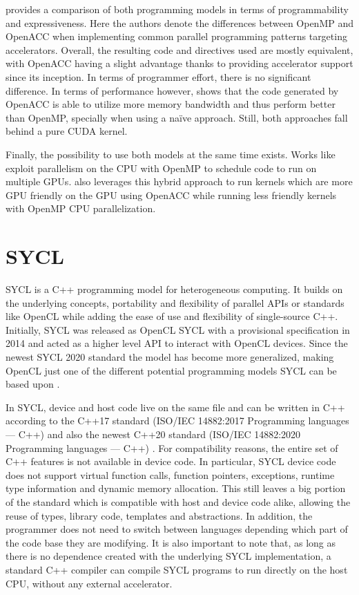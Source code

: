 \cite{openmp_vs_openacc} provides a comparison of both programming models in terms of programmability and expressiveness. Here the authors denote the differences between OpenMP and OpenACC when implementing common parallel programming patterns targeting accelerators. Overall, the resulting code and directives used are mostly equivalent, with OpenACC having a slight advantage thanks to providing accelerator support since its inception. In terms of programmer effort, there is no significant difference. In terms of performance however, \cite{cuda_openacc_openmp_performance} shows that the code generated by OpenACC is able to utilize more memory bandwidth and thus perform better than OpenMP, specially when using a naïve approach. Still, both approaches fall behind a pure CUDA kernel.

Finally, the possibility to use both models at the same time exists. Works like \cite{openmp_openacc_multigpus} exploit parallelism on the CPU with OpenMP to schedule code to run on multiple GPUs. \cite{openmp_openacc_molecular_docking} also leverages this hybrid approach to run kernels which are more GPU friendly on the GPU using OpenACC while running less friendly kernels with OpenMP CPU parallelization.

\section{SYCL}
SYCL \cite{sycl_2020_standard} is a C++ programming model for heterogeneous computing. It builds on the underlying concepts, portability and flexibility of parallel APIs or standards like OpenCL while adding the ease of use and flexibility of single-source C++. Initially, SYCL was released as OpenCL SYCL with a provisional specification in 2014 and acted as a higher level API to interact with OpenCL devices. Since the newest SYCL 2020 standard the model has become more generalized, making OpenCL just one of the different potential programming models SYCL can be based upon \cite{sycl_faq}.

In SYCL, device and host code live on the same file and can be written in C++ according to the C++17 standard (ISO/IEC 14882:2017 Programming languages — C++) \cite{cpp17} and also the newest C++20 standard (ISO/IEC 14882:2020 Programming languages — C++) \cite{cpp20}. For compatibility reasons, the entire set of C++ features is not available in device code. In particular, SYCL device code does not support virtual function calls, function pointers, exceptions, runtime type information and dynamic memory allocation.  This still leaves a big portion of the standard which is compatible with host and device code alike, allowing the reuse of types, library code, templates and abstractions. In addition, the programmer does not need to switch between languages depending which part of the code base they are modifying. It is also important to note that, as long as there is no dependence created with the underlying SYCL implementation, a standard C++ compiler can compile SYCL programs to run directly on the host CPU, without any external accelerator.

